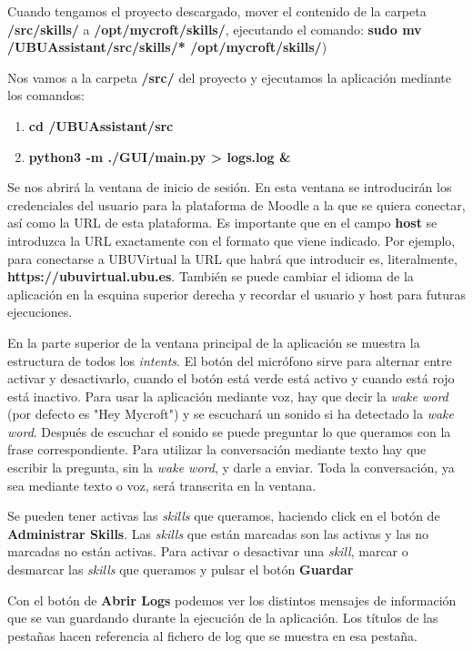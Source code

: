 Cuando tengamos el proyecto descargado, mover el contenido de la carpeta \textbf{\detokenize{~}/src/skills/} a \textbf{/opt/mycroft/skills/}, ejecutando el comando:
\textbf{sudo mv \detokenize{~}/UBUAssistant/src/skills/* /opt/mycroft/skills/})

Nos vamos a la carpeta \textbf{/src/} del proyecto y ejecutamos la aplicación mediante los comandos:
\begin{enumerate}
	\item \textbf{cd \detokenize{~}/UBUAssistant/src}
	\item \textbf{python3 -m ./GUI/main.py \detokenize{>}> logs.log \&}
\end{enumerate}
Se nos abrirá la ventana de inicio de sesión. En esta ventana se introducirán los credenciales del usuario para la plataforma de Moodle a la que se quiera conectar, así como la URL de esta plataforma.
Es importante que en el campo \textbf{host} se introduzca la URL exactamente con el formato que viene indicado. Por ejemplo, para conectarse a UBUVirtual la URL que habrá que introducir es, literalmente, \textbf{https://ubuvirtual.ubu.es}.
También se puede cambiar el idioma de la aplicación en la esquina superior derecha y recordar el usuario y host para futuras ejecuciones.


En la parte superior de la ventana principal de la aplicación se muestra la estructura de todos los \textit{intents}. El botón del micrófono sirve para alternar entre activar y desactivarlo, cuando el botón está verde está activo y cuando está rojo está inactivo.
Para usar la aplicación mediante voz, hay que decir la \textit{wake word} (por defecto es "Hey Mycroft") y se escuchará un sonido si ha detectado la \textit{wake word}. Después de escuchar el sonido se puede preguntar lo que queramos con la frase correspondiente. Para utilizar la conversación mediante texto hay que escribir la pregunta, sin la \textit{wake word}, y darle a enviar. Toda la conversación, ya sea mediante texto o voz, será transcrita en la ventana.

 

Se pueden tener activas las \textit{skills} que queramos, haciendo click en el botón de \textbf{Administrar Skills}. Las \textit{skills} que están marcadas son las activas y las no marcadas no están activas. Para activar o desactivar una \textit{skill}, marcar o desmarcar las \textit{skills} que queramos y pulsar el botón \textbf{Guardar}


Con el botón de \textbf{Abrir Logs} podemos ver los distintos mensajes de información que se van guardando durante la ejecución de la aplicación. Los títulos de las pestañas hacen referencia al fichero de log que se muestra en esa pestaña.

